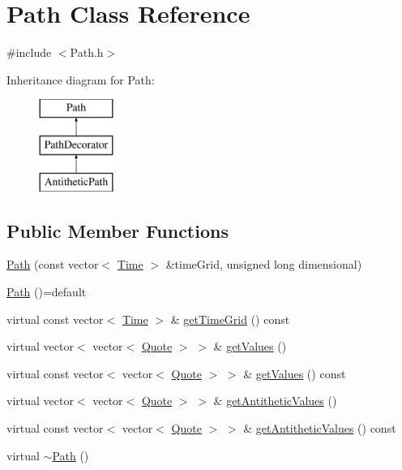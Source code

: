 \hypertarget{class_path}{}\section{Path Class Reference}
\label{class_path}


{\ttfamily \#include $<$Path.\+h$>$}

Inheritance diagram for Path\+:\begin{figure}[H]
\begin{center}
\leavevmode
\includegraphics[height=3.000000cm]{class_path}
\end{center}
\end{figure}
\subsection*{Public Member Functions}
\begin{DoxyCompactItemize}
\item 
\hyperlink{class_path_a589f506da73b9b80f21a27102656b2ba}{Path} (const vector$<$ \hyperlink{_name_def_8h_ac2d3e0ba793497bcca555c7c2cf64ff3}{Time} $>$ \&time\+Grid, unsigned long dimensional)
\item 
\hyperlink{class_path_a6ae58f503394f12a90ff7d059d30d26c}{Path} ()=default
\item 
virtual const vector$<$ \hyperlink{_name_def_8h_ac2d3e0ba793497bcca555c7c2cf64ff3}{Time} $>$ \& \hyperlink{class_path_a774bc2169ae87142b8165c3934a9deb9}{get\+Time\+Grid} () const
\item 
virtual vector$<$ vector$<$ \hyperlink{_name_def_8h_a642a6c5fd87319d922637de0e0bb0305}{Quote} $>$ $>$ \& \hyperlink{class_path_aeeb21dd5019a717cc8a36ddb0f82f427}{get\+Values} ()
\item 
virtual const vector$<$ vector$<$ \hyperlink{_name_def_8h_a642a6c5fd87319d922637de0e0bb0305}{Quote} $>$ $>$ \& \hyperlink{class_path_a6d3469e98b5da124b51ca8a9cc2caa28}{get\+Values} () const
\item 
virtual vector$<$ vector$<$ \hyperlink{_name_def_8h_a642a6c5fd87319d922637de0e0bb0305}{Quote} $>$ $>$ \& \hyperlink{class_path_ae6097f4761ac45d2d3656c35f09563f0}{get\+Antithetic\+Values} ()
\item 
virtual const vector$<$ vector$<$ \hyperlink{_name_def_8h_a642a6c5fd87319d922637de0e0bb0305}{Quote} $>$ $>$ \& \hyperlink{class_path_aadadd7f7ad38c779e36f3ef2805f30e9}{get\+Antithetic\+Values} () const
\item 
virtual \hyperlink{class_path_a11618e66fc700531d3ad998acfdb88a3}{$\sim$\+Path} ()
\end{DoxyCompactItemize}
